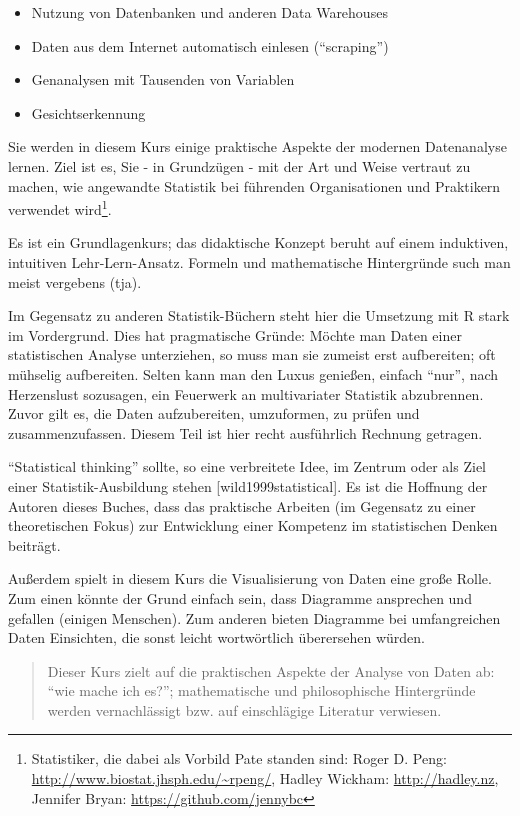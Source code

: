 \documentclass[12pt,ngerman,]{book}
\providecommand{\tightlist}{%
  \setlength{\itemsep}{0pt}\setlength{\parskip}{0pt}}
\let\rmarkdownfootnote\footnote%
\def\footnote{\protect\rmarkdownfootnote}
\begin{document}
\begin{itemize}
\tightlist
\item
  Nutzung von Datenbanken und anderen Data Warehouses
\item
  Daten aus dem Internet automatisch einlesen (``scraping'')
\item
  Genanalysen mit Tausenden von Variablen
\item
  Gesichtserkennung
\end{itemize}

Sie werden in diesem Kurs einige praktische Aspekte der modernen
Datenanalyse lernen. Ziel ist es, Sie - in Grundzügen - mit der Art und
Weise vertraut zu machen, wie angewandte Statistik bei führenden
Organisationen und Praktikern verwendet wird\footnote{Statistiker, die
  dabei als Vorbild Pate standen sind: Roger D. Peng:
  \url{http://www.biostat.jhsph.edu/~rpeng/}, Hadley Wickham:
  \url{http://hadley.nz}, Jennifer Bryan:
  \url{https://github.com/jennybc}}.

Es ist ein Grundlagenkurs; das didaktische Konzept beruht auf einem
induktiven, intuitiven Lehr-Lern-Ansatz. Formeln und mathematische
Hintergründe such man meist vergebens (tja).

Im Gegensatz zu anderen Statistik-Büchern steht hier die Umsetzung mit R
stark im Vordergrund. Dies hat pragmatische Gründe: Möchte man Daten
einer statistischen Analyse unterziehen, so muss man sie zumeist erst
aufbereiten; oft mühselig aufbereiten. Selten kann man den Luxus
genießen, einfach ``nur'', nach Herzenslust sozusagen, ein Feuerwerk an
multivariater Statistik abzubrennen. Zuvor gilt es, die Daten
aufzubereiten, umzuformen, zu prüfen und zusammenzufassen. Diesem Teil
ist hier recht ausführlich Rechnung getragen.

``Statistical thinking'' sollte, so eine verbreitete Idee, im Zentrum
oder als Ziel einer Statistik-Ausbildung stehen
{[}wild1999statistical{]}. Es ist die Hoffnung der Autoren dieses
Buches, dass das praktische Arbeiten (im Gegensatz zu einer
theoretischen Fokus) zur Entwicklung einer Kompetenz im statistischen
Denken beiträgt.

Außerdem spielt in diesem Kurs die Visualisierung von Daten eine große
Rolle. Zum einen könnte der Grund einfach sein, dass Diagramme
ansprechen und gefallen (einigen Menschen). Zum anderen bieten Diagramme
bei umfangreichen Daten Einsichten, die sonst leicht wortwörtlich
überersehen würden.

\begin{quote}
Dieser Kurs zielt auf die praktischen Aspekte der Analyse von Daten ab:
``wie mache ich es?''; mathematische und philosophische Hintergründe
werden vernachlässigt bzw. auf einschlägige Literatur verwiesen.
\end{quote}
\end{document}
